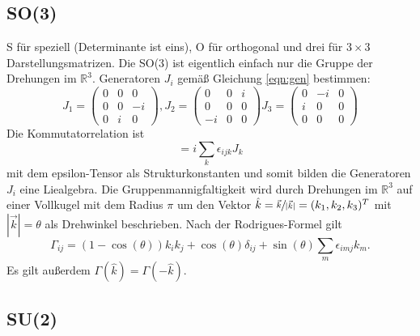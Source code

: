 \documentclass[
  captions=tableheading,  %
  titlepage=firstiscover, %
]{scrartcl}
\begin{document}
\subsection{SO(3)}
S für speziell (Determinante ist eins), O für orthogonal und drei für $3 \times 3$ Darstellungsmatrizen.
Die SO(3) ist eigentlich einfach nur  die Gruppe der Drehungen im $\mathbb{R}^3$.
Generatoren $J_i$ gemäß Gleichung \eqref{eqn:gen} bestimmen:
\begin{equation*}
  J_1 = 
  \begin{pmatrix}
    0 & 0 & 0   \\
    0 & 0 & -i  \\
    0 & i & 0 
  \end{pmatrix}, 
  J_2 = 
  \begin{pmatrix}
    0 & 0   & i \\
    0 & 0   & 0 \\
    -i & 0  & 0 
  \end{pmatrix}
  J_3= 
  \begin{pmatrix}
    0 & -i  & 0 \\
    i & 0   & 0 \\
    0 & 0   & 0 
  \end{pmatrix}
\end{equation*}
Die Kommutatorrelation ist 
\begin{equation*}
  [J_i, J_j] = i \sum_k \epsilon_{ijk} J_k 
\end{equation*}
mit dem epsilon-Tensor als Strukturkonstanten und somit bilden die Generatoren $J_i$ eine Liealgebra.
Die Gruppenmannigfaltigkeit wird durch  Drehungen im $\mathbb{R}^3$ auf einer Vollkugel mit dem Radius $\pi$ 
um den Vektor $\hat{k} = \sfrac{\vec{k}}{|\vec{k}|} = (k_1, k_2, k_3)^T$ mit $|\vec{k}| = \theta$ als
Drehwinkel beschrieben.
Nach der Rodrigues-Formel gilt 
\begin{equation*}
  \Gamma_{ij} = (1-\cos(\theta)) k_i k_j + \cos(\theta) \delta_{ij} + \sin(\theta) \sum_m \epsilon_{imj}k_m.
\end{equation*}
Es gilt außerdem $\Gamma(\hat{k}) = \Gamma(-\hat{k})$.
\subsection{SU(2)}
\end{document}
